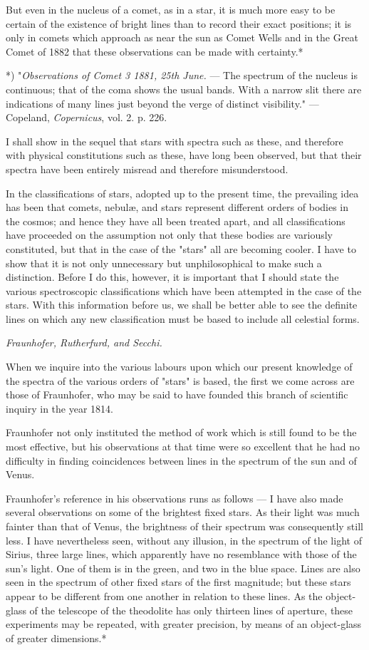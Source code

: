 \documentclass[a4paper, 12pt, oneside, polutonikogreek, english]{article}
\begin{document}
But even in the nucleus of a comet, as in a star, it is much more easy to be certain of the existence of bright lines than to record their exact positions; it is only in comets which approach as near the sun as Comet Wells and in the Great Comet of 1882 that these observations can be made with certainty.*

*) "\emph{Observations of Comet 3 1881, 25th June.} --- The spectrum of the nucleus is continuous; that of the coma shows the usual bands. With a narrow slit there are indications of many lines just beyond the verge of distinct visibility." --- Copeland, \emph{Copernicus}, vol. 2. p. 226.

I shall show in the sequel that stars with spectra such as these, and therefore with physical constitutions such as these, have long been observed, but that their spectra have been entirely misread and therefore misunderstood.

In the classifications of stars, adopted up to the present time, the prevailing idea has been that comets, nebulæ, and stars represent different orders of bodies in the cosmos; and hence they have all been treated apart, and all classifications have proceeded on the assumption not only that these bodies are variously constituted, but that in the case of the "stars" all are becoming cooler. I have to show that it is not only unnecessary but unphilosophical to make such a distinction. Before I do this, however, it is important that I should state the various spectroscopic classifications which have been attempted in the case of the stars. With this information before us, we shall be better able to see the definite lines on which any new classification must be based to include all celestial forms.

\emph{Fraunhofer, Rutherfurd, and Secchi.}

When we inquire into the various labours upon which our present knowledge of the spectra of the various orders of "stars" is based, the first we come across are those of Fraunhofer, who may be said to have founded this branch of scientific inquiry in the year 1814.

Fraunhofer not only instituted the method of work which is still found to be the most effective, but his observations at that time were so excellent that he had no difficulty in finding coincidences between lines in the spectrum of the sun and of Venus.

Fraunhofer's reference in his observations runs as follows --- I have also made several observations on some of the brightest fixed stars. As their light was much fainter than that of Venus, the brightness of their spectrum was consequently still less. I have nevertheless seen, without any illusion, in the spectrum of the light of Sirius, three large lines, which apparently have no resemblance with those of the sun's light. One of them is in the green, and two in the blue space. Lines are also seen in the spectrum of other fixed stars of the first magnitude; but these stars appear to be different from one another in relation to these lines. As the object-glass of the telescope of the theodolite has only thirteen lines of aperture, these experiments may be repeated, with greater precision, by means of an object-glass of greater dimensions.*
\end{document}
